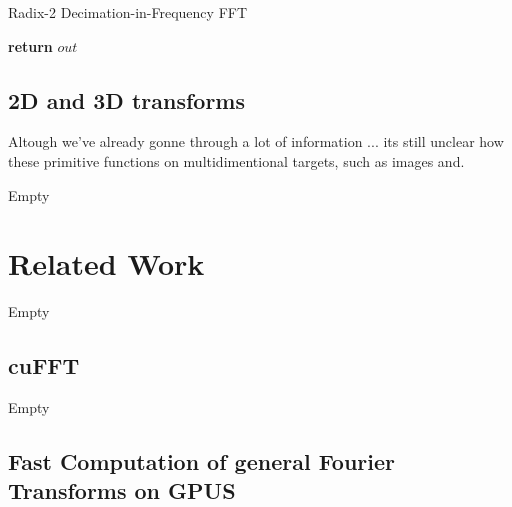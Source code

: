 \documentclass[
  oneside,
  11pt, a4paper,
  footinclude=true,
  headinclude=true,
  cleardoublepage=empty
]{scrbook}
\begin{document}

\begin{algorithm}
    \caption{Radix-2 Decimation-in-Frequency FFT} \label{alg:dit}

    \textbf{return} $out$\;
\end{algorithm}

\subsection{2D and 3D transforms}

Altough we've already gonne through a lot of information ... its still unclear how these primitive functions on multidimentional targets, such as images and.

Empty

\section{Related Work}

Empty

\subsection{cuFFT}

Empty

\subsection{Fast Computation of general Fourier Transforms on GPUS}
\end{document}
